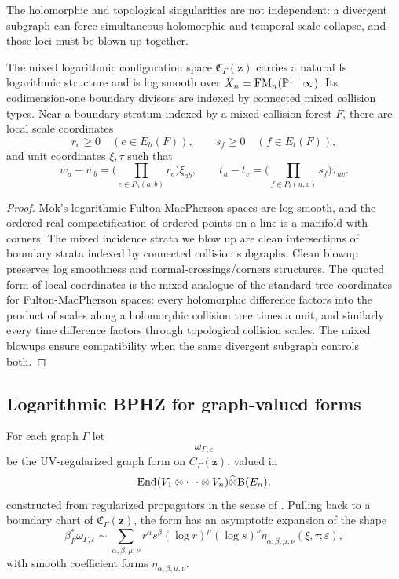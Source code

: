The holomorphic and topological singularities are not independent: a divergent subgraph can force simultaneous holomorphic and temporal scale collapse, and those loci must be blown up together.

\begin{proposition}%
The mixed logarithmic configuration space $\mathfrak C_\Gamma(\mathbf z)$ carries a natural fs logarithmic structure and is log smooth over $X_n=\mathrm{FM}_n(\mathbb P^1\mid\infty)$. Its codimension-one boundary divisors are indexed by connected mixed collision types. Near a boundary stratum indexed by a mixed collision forest $F$, there are local scale coordinates
\[
 r_e\ge 0 \quad (e\in E_h(F)),
 \qquad
 s_f\ge 0 \quad (f\in E_t(F)),
\]
and unit coordinates $\xi,\tau$ such that
\[
 w_a-w_b = \Big(\prod_{e\in P_h(a,b)}r_e\Big)\xi_{ab},
 \qquad
 t_u-t_v = \Big(\prod_{f\in P_t(u,v)}s_f\Big)\tau_{uv}.
\]
\end{proposition}

\begin{proof}
Mok's logarithmic Fulton-MacPherson spaces are log smooth, and the ordered real compactification of ordered points on a line is a manifold with corners. The mixed incidence strata we blow up are clean intersections of boundary strata indexed by connected collision subgraphs. Clean blowup preserves log smoothness and normal-crossings/corners structures. The quoted form of local coordinates is the mixed analogue of the standard tree coordinates for Fulton-MacPherson spaces: every holomorphic difference factors into the product of scales along a holomorphic collision tree times a unit, and similarly every time difference factors through topological collision scales. The mixed blowups ensure compatibility when the same divergent subgraph controls both.
\end{proof}

\subsection{Logarithmic BPHZ for graph-valued forms}
For each graph $\Gamma$ let
\[
 \omega_{\Gamma,\varepsilon}
\]
be the UV-regularized graph form on $C_\Gamma(\mathbf z)$, valued in
\[
 \mathrm{End}(V_1\otimes\cdots\otimes V_n)\widehat\otimes \mathrm B(E_n),
\]
constructed from regularized propagators in the sense of \cite{GKW25,DNP25}. Pulling back to a boundary chart of $\mathfrak C_\Gamma(\mathbf z)$, the form has an asymptotic expansion of the shape
\[
 \beta_F^*\omega_{\Gamma,\varepsilon}
 \sim
 \sum_{\alpha,\beta,\mu,\nu}
 r^{\alpha}s^{\beta}(\log r)^{\mu}(\log s)^{\nu}
 \eta_{\alpha,\beta,\mu,\nu}(\xi,\tau;\varepsilon),
\]
with smooth coefficient forms $\eta_{\alpha,\beta,\mu,\nu}$.

